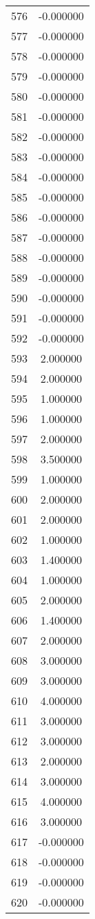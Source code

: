 \documentclass[12pt]{article}
\begin{document}
\begin{longtable}{@{}cc@{}}
576 & -0.000000 \\
577 & -0.000000 \\
578 & -0.000000 \\
579 & -0.000000 \\
580 & -0.000000 \\
581 & -0.000000 \\
582 & -0.000000 \\
583 & -0.000000 \\
584 & -0.000000 \\
585 & -0.000000 \\
586 & -0.000000 \\
587 & -0.000000 \\
588 & -0.000000 \\
589 & -0.000000 \\
590 & -0.000000 \\
591 & -0.000000 \\
592 & -0.000000 \\
593 & 2.000000 \\
594 & 2.000000 \\
595 & 1.000000 \\
596 & 1.000000 \\
597 & 2.000000 \\
598 & 3.500000 \\
599 & 1.000000 \\
600 & 2.000000 \\
601 & 2.000000 \\
602 & 1.000000 \\
603 & 1.400000 \\
604 & 1.000000 \\
605 & 2.000000 \\
606 & 1.400000 \\
607 & 2.000000 \\
608 & 3.000000 \\
609 & 3.000000 \\
610 & 4.000000 \\
611 & 3.000000 \\
612 & 3.000000 \\
613 & 2.000000 \\
614 & 3.000000 \\
615 & 4.000000 \\
616 & 3.000000 \\
617 & -0.000000 \\
618 & -0.000000 \\
619 & -0.000000 \\
620 & -0.000000 \\

\end{longtable}
\end{document}
